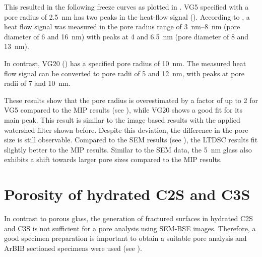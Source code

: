 This resulted in the following freeze curves as plotted in .
\acs{VG5} specified with a pore radius of \qty{2.5}{\nano\meter} has two peaks in the heat-flow signal ().
According to  \cite{brun.1977}, a heat flow signal was measured in the pore radius range of \qtyrange{3}{8}{\nano\meter} (pore diameter of \num{6} and \qty{16}{\nano\meter}) with peaks at \num{4} and \qty{6.5}{\nano\meter} (pore diameter of \num{8} and \qty{13}{\nano\meter}).

In contrast, \acs{VG20} () has a specified pore radius of \qty{10}{\nano\meter}. The measured heat flow signal can be converted to pore radii of \num{5} and \qty{12}{\nano\meter}, with peaks at pore radii of \num{7} and \qty{10}{\nano\meter}.

These results show that the pore radius is overestimated by a factor of up to \num{2} for \acs{VG5} compared to the \ac{MIP} results (see ), while \acs{VG20} shows a good fit for its main peak.
This result is similar to the image based results with the applied watershed filter shown before.
Despite this deviation, the difference in the pore size is still observable.
Compared to the \ac{SEM} results (see ), the \ac{LTDSC} results fit slightly better to the \ac{MIP} results.
Similar to the \ac{SEM} data, the \qty{5}{\nano\meter} glass also exhibits a shift towards larger pore sizes compared to the \ac{MIP} results.







\FloatBarrier
\section{Porosity of hydrated \acs*{C2S} and \acs*{C3S}}

In contrast to porous glass, the generation of fractured surfaces in hydrated \ac{C2S} and \ac{C3S} is not sufficient for a pore analysis using \ac{SEM}-\ac{BSE} images.
Therefore, a good specimen preparation is important to obtain a suitable pore analysis and \ac{ArBIB} sectioned specimens were used (see ).

